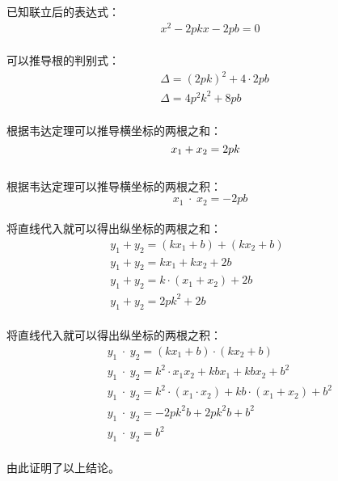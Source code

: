 \documentclass[UTF8]{ctexart}
\begin{document}
    已知联立后的表达式：
    \begin{align}
        x^2-2pkx-2pb=0
    \end{align}\\
    可以推导根的判别式：
    \begin{align}
        &\Delta=(2pk)^2+4\cdot 2pb\\[3mm]
        &\Delta=4p^2k^2+8pb
    \end{align}\\
    根据韦达定理可以推导横坐标的两根之和：
    \begin{equation}
        x_1+x_2=2pk\hphantom{-}
    \end{equation}\\
    根据韦达定理可以推导横坐标的两根之积：
    \begin{equation}
        x_1\hspace{3pt}\cdot\hspace{3pt}x_2=-2pb
    \end{equation}\\
    将直线代入就可以得出纵坐标的两根之和：\vspace{3pt}
    \begin{align}
        &y_1+y_2=(kx_1+b)+(kx_2+b)~~~~~~~~~~~~~~\\[3mm]
        &y_1+y_2=kx_1+kx_2+2b\\[3mm]
        &y_1+y_2=k\cdot(x_1+x_2)+2b\\[3mm]
        &y_1+y_2=2pk^2+2b
    \end{align}\\
    将直线代入就可以得出纵坐标的两根之积：\vspace{3pt}
    \begin{align}
        &~~~~y_1\hspace{3pt}\cdot\hspace{3pt}y_2=(kx_1+b)\cdot(kx_2+b)\\[3mm]
        &~~~~y_1\hspace{3pt}\cdot\hspace{3pt}y_2=k^2\cdot x_1x_2+kbx_1+kbx_2+b^2\\[3mm]
        &~~~~y_1\hspace{3pt}\cdot\hspace{3pt}y_2=k^2\cdot(x_1\cdot x_2)+kb\cdot(x_1+x_2)+b^2\\[3mm]
        &~~~~y_1\hspace{3pt}\cdot\hspace{3pt}y_2=-2pk^2b+2pk^2b+b^2\\[3mm]
        &~~~~y_1\hspace{3pt}\cdot\hspace{3pt}y_2=b^2
    \end{align}\\
    由此证明了以上结论。
\end{document}
